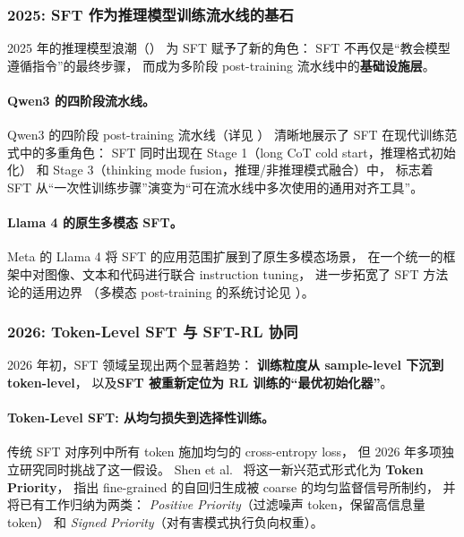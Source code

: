 \subsubsection{2025: SFT 作为推理模型训练流水线的基石}
\label{sec:t1-2025}

2025 年的推理模型浪潮（）
为 SFT 赋予了新的角色：
SFT 不再仅是``教会模型遵循指令''的最终步骤，
而成为多阶段 post-training 流水线中的\textbf{基础设施层}。

\paragraph{Qwen3 的四阶段流水线。}
Qwen3 \cite{yang2025qwen3} 的四阶段 post-training 流水线（详见 ）
清晰地展示了 SFT 在现代训练范式中的多重角色：
SFT 同时出现在 Stage 1（long CoT cold start，推理格式初始化）
和 Stage 3（thinking mode fusion，推理/非推理模式融合）中，
标志着 SFT 从``一次性训练步骤''演变为``可在流水线中多次使用的通用对齐工具''。

\paragraph{Llama 4 的原生多模态 SFT。}
Meta 的 Llama 4 \cite{meta2025llama4} 将 SFT 的应用范围扩展到了原生多模态场景，
在一个统一的框架中对图像、文本和代码进行联合 instruction tuning，
进一步拓宽了 SFT 方法论的适用边界
（多模态 post-training 的系统讨论见 ）。

\subsubsection{2026: Token-Level SFT 与 SFT-RL 协同}
\label{sec:t1-2026}

2026 年初，SFT 领域呈现出两个显著趋势：
\textbf{训练粒度从 sample-level 下沉到 token-level}，
以及\textbf{SFT 被重新定位为 RL 训练的``最优初始化器''}。

\paragraph{Token-Level SFT: 从均匀损失到选择性训练。}
传统 SFT 对序列中所有 token 施加均匀的 cross-entropy loss，
但 2026 年多项独立研究同时挑战了这一假设。
Shen et al.\ \cite{shen2026tokenpriority} 将这一新兴范式形式化为
\textbf{Token Priority}，
指出 fine-grained 的自回归生成被 coarse 的均匀监督信号所制约，
并将已有工作归纳为两类：
\emph{Positive Priority}（过滤噪声 token，保留高信息量 token）
和 \emph{Signed Priority}（对有害模式执行负向权重）。

